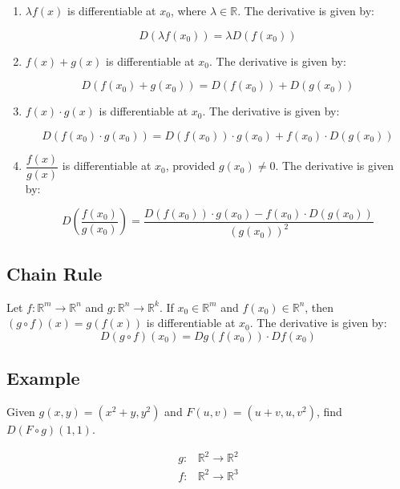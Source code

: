 \documentclass[11pt]{article}
\begin{document}
\begin{enumerate}
    \item \( \lambda f(x) \) is differentiable at \( x_0 \), where \( \lambda \in \mathbb{R} \). The derivative is given by:
    
    \[
    D(\lambda f(x_0)) = \lambda D(f(x_0))
    \]

    \item \( f(x) + g(x) \) is differentiable at \( x_0 \). The derivative is given by:

    \[
    D(f(x_0) + g(x_0)) = D(f(x_0)) + D(g(x_0))
    \]

    \item \( f(x) \cdot g(x) \) is differentiable at \( x_0 \). The derivative is given by:
    
    \[
    D(f(x_0) \cdot g(x_0)) = D(f(x_0)) \cdot g(x_0) + f(x_0) \cdot D(g(x_0))
    \]

    \item \( \dfrac{f(x)}{g(x)} \) is differentiable at \( x_0 \), provided \( g(x_0) \neq 0 \). The derivative is given by:
    
    \[
    D\left( \frac{f(x_0)}{g(x_0)} \right) = \frac{D(f(x_0)) \cdot g(x_0) - f(x_0) \cdot D(g(x_0))}{(g(x_0))^2}
    \]

\end{enumerate}

\subsection{Chain Rule}

Let \( f : \mathbb{R}^m \rightarrow \mathbb{R}^n \) and \( g : \mathbb{R}^n \rightarrow \mathbb{R}^k \). If \( x_0 \in \mathbb{R}^m \) and \( f(x_0) \in \mathbb{R}^n \), then \( (g \circ f)(x) = g(f(x)) \) is differentiable at \( x_0 \). The derivative is given by:
\[
D(g \circ f)(x_0) = Dg(f(x_0)) \cdot Df(x_0)
\]

\subsection*{Example}
Given \( g(x, y) = (x^2 + y, y^2) \) and \( F(u, v) = (u + v, u, v^2) \), find \( D(F \circ g)(1, 1) \).

\begin{align*}
g : & \mathbb{R}^2 \rightarrow \mathbb{R}^2 \\
f : & \mathbb{R}^2 \rightarrow \mathbb{R}^3
\end{align*}
\end{document}
